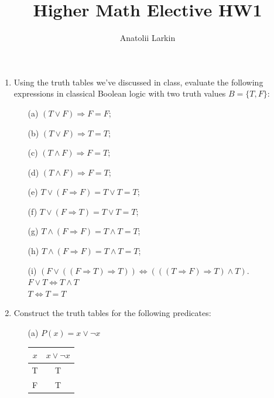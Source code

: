 \documentclass[12pt]{article}
\title{Higher Math Elective HW1}
\author{Anatolii Larkin}
\begin{document}
\maketitle

\begin{enumerate}

    \item Using the truth tables we’ve discussed in class, evaluate the following expressions in classical Boolean logic with two truth values \(B = \{T, F\}\):

    \begin{enumerate}
        \item[(a)] \((T \lor F) \Rightarrow F = F\);
        \item[(b)] \((T \lor F) \Rightarrow T = T\);
        \item[(c)] \((T \land F) \Rightarrow F = T\);
        \item[(d)] \((T \land F) \Rightarrow F = T\);
        \item[(e)] \(T \lor (F \Rightarrow F) = T \lor T = T\);
        \item[(f)] \(T \lor (F \Rightarrow T) = T \lor T = T\);
        \item[(g)] \(T \land (F \Rightarrow F) = T \land T = T\);
        \item[(h)] \(T \land (F \Rightarrow F) = T \land T = T\);
        \item[(i)] \((F \lor ((F \Rightarrow T) \Rightarrow T)) \Leftrightarrow (((T \Rightarrow F) \Rightarrow T) \land T)\). \\
        \(F \lor T \Leftrightarrow T \land T\) \\
        \(T \Leftrightarrow T = T\)
    \end{enumerate}

    \item Construct the truth tables for the following predicates:

    \begin{enumerate}
        \item[(a)] \(P(x) = x \lor \neg x\)
        \begin{center}
        \begin{tabular}{c|c}
        \(x\) & \(x \lor \neg x\) \\
        \hline
        T & T \\
        F & T \\
        \end{tabular}
        \end{center}


\end{enumerate}
\end{enumerate}
\end{document}
